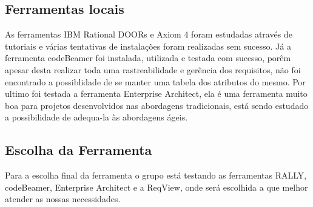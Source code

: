 	\subsection{Ferramentas locais}
		As ferramentas IBM Rational DOORs e Axiom 4 foram estudadas através de tutoriais e várias tentativas de instalações foram realizadas sem sucesso. Já a ferramenta codeBeamer foi instalada, utilizada e testada com sucesso, porêm apesar desta realizar toda uma rastreabilidade e gerência dos requisitos, não foi encontrado a possiblidade de se manter uma tabela dos atributos do mesmo. Por ultimo foi testada a ferramenta Enterprise Architect, ela é uma ferramenta muito boa para projetos desenvolvidos nas abordagens tradicionais, está sendo estudado a possibilidade de adequa-la às abordagens ágeis.

	\subsection{Escolha da Ferramenta}
		Para a escolha final da ferramenta o grupo está testando as ferramentas RALLY, codeBeamer, Enterprise Architect e a ReqView, onde será escolhida a que melhor atender as nossas necessidades.